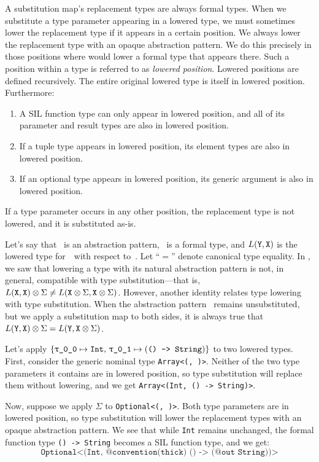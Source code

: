 \documentclass[../generics]{subfiles}
\begin{document}
A substitution map's replacement types are always formal types. When we substitute a type parameter appearing in a lowered type, we must sometimes lower the replacement type if it appears in a certain position. We always lower the replacement type with an opaque abstraction pattern. We do this precisely in those positions where  would lower a formal type that appears there. Such a position within a type is referred to as \emph{lowered position}. Lowered positions are defined recursively. The entire original lowered type is itself in lowered position. Furthermore:
\begin{enumerate}
\item A SIL function type can only appear in lowered position, and all of its parameter and result types are also in lowered position.
\item If a tuple type appears in lowered position, its element types are also in lowered position.
\item If an optional type appears in lowered position, its generic argument is also in lowered position.
\end{enumerate}
If a type parameter occurs in any other position, the replacement type is not lowered, and it is substituted as-is.

Let's say that \tY~is an abstraction pattern, \tX~is a formal type, and $L(\texttt{Y}, \texttt{X})$ is the lowered type for~\tX\ with respect to~\tY. Let ``$=$'' denote canonical type equality. In , we saw that lowering a type with its natural abstraction pattern is not, in general, compatible with type substitution---that is, $L(\texttt{X}, \texttt{X}) \otimes \Sigma \neq L(\texttt{X} \otimes \Sigma, \texttt{X} \otimes \Sigma)$. However, another identity relates type lowering with type substitution. When the abstraction pattern \tY\ remains unsubstituted, but we apply a substitution map to both sides, it is always true that $L(\texttt{Y}, \texttt{X}) \otimes \Sigma = L(\texttt{Y}, \texttt{X} \otimes \Sigma)$.

\begin{example}
Let's apply $\SubstMap{\SubstType{\rT}{Int},\,\rU \mapsto (\texttt{() -> String})}$ to two lowered types. First, consider the generic nominal type \texttt{Array<(\rT, \rU)>}. Neither of the two type parameters it contains are in lowered position, so type substitution will replace them without lowering, and we get \texttt{Array<(Int, () -> String)>}.

Now, suppose we apply $\Sigma$ to \texttt{Optional<(\rT, \rU)>}. Both type parameters are in lowered position, so type substitution will lower the replacement types with an opaque abstraction pattern. We see that while \texttt{Int} remains unchanged, the formal function type \texttt{() -> String} becomes a SIL function type, and we get:
\[
\texttt{Optional<(Int, @convention(thick) () -> (@out String))>}
\]
\end{example}
\end{document}
